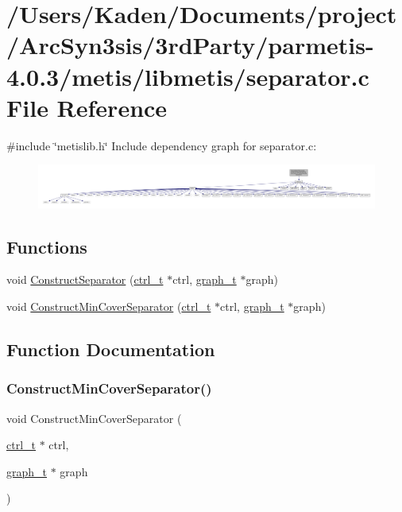 \hypertarget{a00272}{}\section{/\+Users/\+Kaden/\+Documents/project/\+Arc\+Syn3sis/3rd\+Party/parmetis-\/4.0.3/metis/libmetis/separator.c File Reference}
\label{a00272}
{\ttfamily \#include \char`\"{}metislib.\+h\char`\"{}}\newline
Include dependency graph for separator.\+c\+:\nopagebreak
\begin{figure}[H]
\begin{center}
\leavevmode
\includegraphics[width=350pt]{a00273}
\end{center}
\end{figure}
\subsection*{Functions}
\begin{DoxyCompactItemize}
\item 
void \hyperlink{a00272_a8da060cb6f592f66c7eb2e31af3ecba5}{Construct\+Separator} (\hyperlink{a00742}{ctrl\+\_\+t} $\ast$ctrl, \hyperlink{a00734}{graph\+\_\+t} $\ast$graph)
\item 
void \hyperlink{a00272_a3a62c26313cff2772d6241e1d250fe3a}{Construct\+Min\+Cover\+Separator} (\hyperlink{a00742}{ctrl\+\_\+t} $\ast$ctrl, \hyperlink{a00734}{graph\+\_\+t} $\ast$graph)
\end{DoxyCompactItemize}


\subsection{Function Documentation}
\mbox{\label{a00272_a3a62c26313cff2772d6241e1d250fe3a}} 
\subsubsection{\texorpdfstring{Construct\+Min\+Cover\+Separator()}{ConstructMinCoverSeparator()}}
{\footnotesize\ttfamily void Construct\+Min\+Cover\+Separator (\begin{DoxyParamCaption}\item[{\hyperlink{a00742}{ctrl\+\_\+t} $\ast$}]{ctrl,  }\item[{\hyperlink{a00734}{graph\+\_\+t} $\ast$}]{graph }\end{DoxyParamCaption})}


